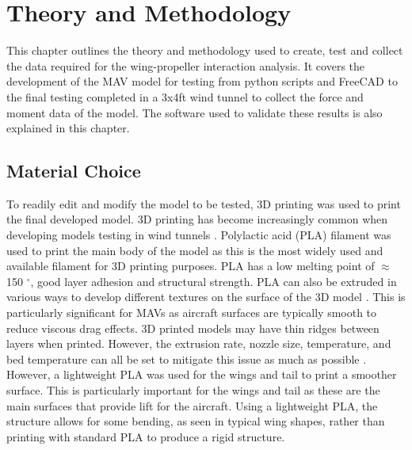 \graphicspath{{./Figs/}}

\chapter{Theory and Methodology}
This chapter outlines the theory and methodology used to create, test and collect the data required for the wing-propeller interaction analysis. It covers the development of the \acrshort{MAV} model for testing from python scripts and FreeCAD to the final testing completed in a 3x4ft wind tunnel to collect the force and moment data of the model. The software used to validate these results is also explained in this chapter. 

\section{Material Choice}
To readily edit and modify the model to be tested, 3D printing was used to print the final developed model. 3D printing has become increasingly common when developing models testing in wind tunnels \cite{Szwedziak2022}. Polylactic acid (\acrshort{PLA}) filament was used to print the main body of the model as this is the most widely used and available filament for 3D printing purposes. \acrshort{PLA} has a low melting point of $\approx$ 150 $^{\circ}$, good layer adhesion and structural strength. \acrshort{PLA} can also be extruded in various ways to develop different textures on the surface of the 3D model \cite{Butt2021}. This is particularly significant for \acrshort{MAV}s as aircraft surfaces are typically smooth to reduce viscous drag effects. 3D printed models may have thin ridges between layers when printed. However, the extrusion rate, nozzle size, temperature, and bed temperature can all be set to mitigate this issue as much as possible \cite{Butt2021} \cite{Olasek2014}. However, a lightweight \acrshort{PLA} was used for the wings and tail to print a smoother surface. This is particularly important for the wings and tail as these are the main surfaces that provide lift for the aircraft. Using a lightweight \acrshort{PLA}, the structure allows for some bending, as seen in typical wing shapes, rather than printing with standard \acrshort{PLA} to produce a rigid structure. 


